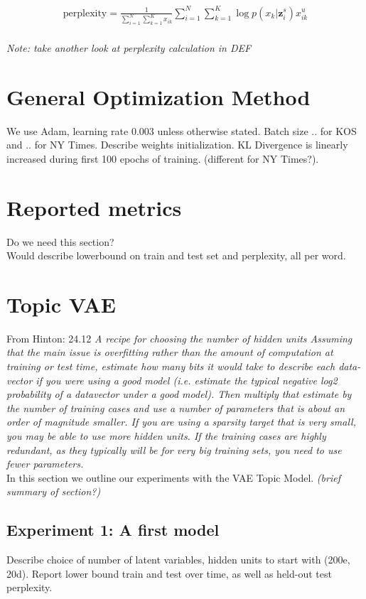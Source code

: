 \documentclass{report}
\begin{document}
	
	\begin{align}
	\text{perplexity} =  \frac{1}{\sum\limits_{i=1}^{N}\sum\limits_{k=1}^{K}x_{ik}}\sum\limits_{i=1}^N\sum\limits_{k=1}^{K} \log p(x_{k}|\mathbf{z}_{i}^{s})x_{ik}^{u}
	\end{align}\\
	\textit{Note: take another look at perplexity calculation in DEF}
	
	\section{General Optimization Method}
	We use Adam, learning rate 0.003 unless otherwise stated. Batch size .. for KOS and .. for NY Times. Describe weights initialization. KL Divergence is linearly increased during first 100 epochs of training. (different for NY Times?).
	
	\section{Reported metrics}
	Do we need this section?
	\\ 
	Would describe lowerbound on train and test set and perplexity, all per word.
	
	\section{Topic VAE}
	
	From Hinton: 24.12 \textit{A recipe for choosing the number of hidden units
		Assuming that the main issue is overfitting rather than the amount of computation at training or
		test time, estimate how many bits it would take to describe each data-vector if you were using a good
		model (i.e. estimate the typical negative log2 probability of a datavector under a good model). Then
		multiply that estimate by the number of training cases and use a number of parameters that is about
		an order of magnitude smaller. If you are using a sparsity target that is very small, you may be able
		to use more hidden units. If the training cases are highly redundant, as they typically will be for very
		big training sets, you need to use fewer parameters.}\\

	In this section we outline our experiments with the VAE Topic Model. \textit{(brief summary of section?)} 
	
	
	
	\subsection{Experiment 1: A first model}
	Describe choice of number of latent variables, hidden units to start with (200e, 20d). Report lower bound train and test over time, as well as held-out test perplexity.
	
\end{document}
